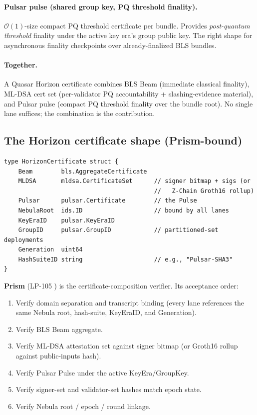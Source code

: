 \paragraph{Pulsar pulse (shared group key, PQ threshold finality).}
$\mathcal{O}(1)$-size compact PQ threshold certificate per bundle.
Provides \emph{post-quantum threshold} finality under the active key
era's group public key. The right shape for asynchronous finality
checkpoints over already-finalized BLS bundles.

\paragraph{Together.}
A Quasar Horizon certificate combines BLS Beam (immediate classical
finality), ML-DSA cert set (per-validator PQ accountability +
slashing-evidence material), and Pulsar pulse (compact PQ threshold
finality over the bundle root). No single lane suffices; the
combination is the contribution.

\subsection{The Horizon certificate shape (Prism-bound)}

\begin{verbatim}
type HorizonCertificate struct {
    Beam        bls.AggregateCertificate
    MLDSA       mldsa.CertificateSet      // signer bitmap + sigs (or
                                          //   Z-Chain Groth16 rollup)
    Pulsar      pulsar.Certificate        // the Pulse
    NebulaRoot  ids.ID                    // bound by all lanes
    KeyEraID    pulsar.KeyEraID
    GroupID     pulsar.GroupID            // partitioned-set deployments
    Generation  uint64
    HashSuiteID string                    // e.g., "Pulsar-SHA3"
}
\end{verbatim}

\textbf{Prism} (LP-105 \cite{lp105}) is the certificate-composition
verifier. Its acceptance order:
\begin{enumerate}[leftmargin=2em,nosep]
  \item Verify domain separation and transcript binding (every lane
        references the same Nebula root, hash-suite, KeyEraID, and
        Generation).
  \item Verify BLS Beam aggregate.
  \item Verify ML-DSA attestation set against signer bitmap (or
        Groth16 rollup against public-inputs hash).
  \item Verify Pulsar Pulse under the active KeyEra/GroupKey.
  \item Verify signer-set and validator-set hashes match epoch state.
  \item Verify Nebula root / epoch / round linkage.
\end{enumerate}

